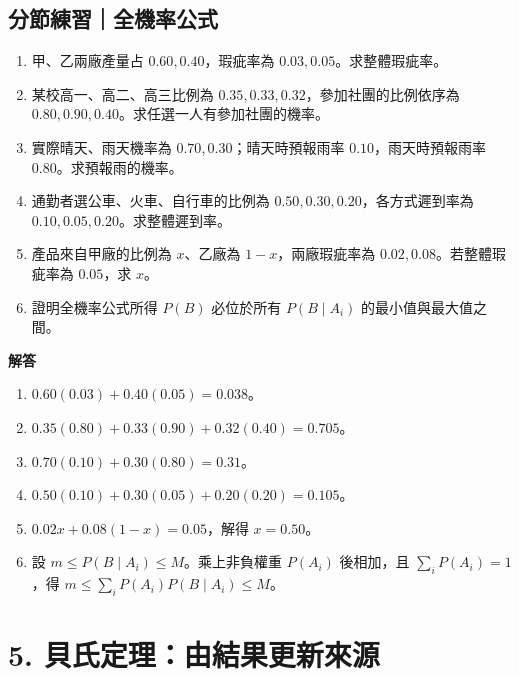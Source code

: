 \documentclass[11pt,a4paper]{article}
\providecommand{\tightlist}{%
  \setlength{\itemsep}{0pt}\setlength{\parskip}{0pt}}
\begin{document}
\begin{HandoutSelfCheck}

\subsection{分節練習｜全機率公式}\label{ux5206ux7bc0ux7df4ux7fd2ux5168ux6a5fux7387ux516cux5f0f}

\begin{enumerate}
\def\labelenumi{\arabic{enumi}.}
\tightlist
\item
  甲、乙兩廠產量占 \(0.60,0.40\)，瑕疵率為 \(0.03,0.05\)。求整體瑕疵率。
\item
  某校高一、高二、高三比例為 \(0.35,0.33,0.32\)，參加社團的比例依序為 \(0.80,0.90,0.40\)。求任選一人有參加社團的機率。
\item
  實際晴天、雨天機率為 \(0.70,0.30\)；晴天時預報雨率 \(0.10\)，雨天時預報雨率 \(0.80\)。求預報雨的機率。
\item
  通勤者選公車、火車、自行車的比例為 \(0.50,0.30,0.20\)，各方式遲到率為 \(0.10,0.05,0.20\)。求整體遲到率。
\item
  產品來自甲廠的比例為 \(x\)、乙廠為 \(1-x\)，兩廠瑕疵率為 \(0.02,0.08\)。若整體瑕疵率為 \(0.05\)，求 \(x\)。
\item
  證明全機率公式所得 \(P(B)\) 必位於所有 \(P(B\mid A_i)\) 的最小值與最大值之間。
\end{enumerate}

\textbf{解答}

\begin{enumerate}
\def\labelenumi{\arabic{enumi}.}
\tightlist
\item
  \(0.60(0.03)+0.40(0.05)=\boxed{0.038}\)。
\item
  \(0.35(0.80)+0.33(0.90)+0.32(0.40)=\boxed{0.705}\)。
\item
  \(0.70(0.10)+0.30(0.80)=\boxed{0.31}\)。
\item
  \(0.50(0.10)+0.30(0.05)+0.20(0.20)=\boxed{0.105}\)。
\item
  \(0.02x+0.08(1-x)=0.05\)，解得 \(\boxed{x=0.50}\)。
\item
  設 \(m\le P(B\mid A_i)\le M\)。乘上非負權重 \(P(A_i)\) 後相加，且 \(\sum_iP(A_i)=1\)，得 \(m\le\sum_iP(A_i)P(B\mid A_i)\le M\)。
\end{enumerate}

\end{HandoutSelfCheck}

\section{5. 貝氏定理：由結果更新來源}\label{ux8c9dux6c0fux5b9aux7406ux7531ux7d50ux679cux66f4ux65b0ux4f86ux6e90}
\end{document}
